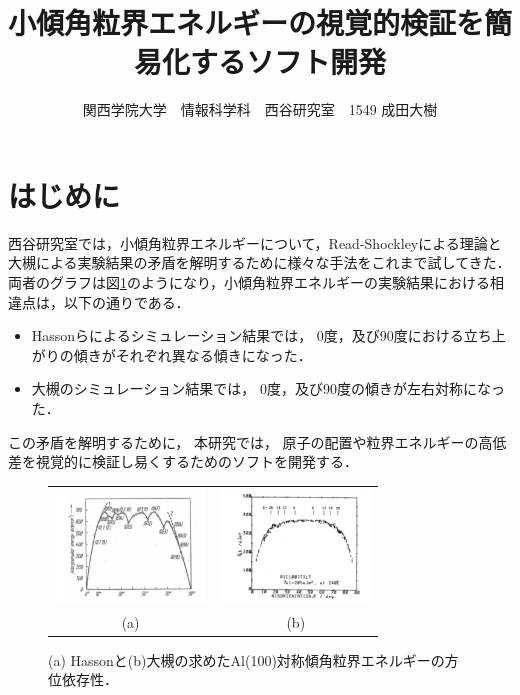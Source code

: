 \documentclass[a4j,twocolumn]{jsarticle}
\begin{document}
\title{小傾角粒界エネルギーの視覚的検証を簡易化するソフト開発}
\author{関西学院大学　情報科学科　西谷研究室　1549 成田大樹}
\date{}
\maketitle

\section{はじめに}
西谷研究室では，小傾角粒界エネルギーについて，Read-Shockleyによる理論と大槻による実験結果の矛盾を解明するために様々な手法をこれまで試してきた．
両者のグラフは図\ref{fig:one}のようになり，小傾角粒界エネルギーの実験結果における相違点は，以下の通りである．
\begin{itemize}
\item Hassonらによるシミュレーション結果では，
0度，及び90度における立ち上がりの傾きがそれぞれ異なる傾きになった．

\item 大槻のシミュレーション結果では，
0度，及び90度の傾きが左右対称になった．
\end{itemize}

この矛盾を解明するために，
本研究では，
原子の配置や粒界エネルギーの高低差を視覚的に検証し易くするためのソフトを開発する．

\begin{figure}[h]
\begin{center}
\begin{tabular}{cc}
   \includegraphics[width=40mm]{./Hasson.png} &
   \includegraphics[width=40mm]{./Otsuki.png} \\
   (a) & (b)
\end{tabular}
  \caption{(a) Hassonと(b)大槻の求めたAl(100)対称傾角粒界エネルギーの方位依存性．}
  \label{fig:one}
\end{center}
\end{figure}
\end{document}
